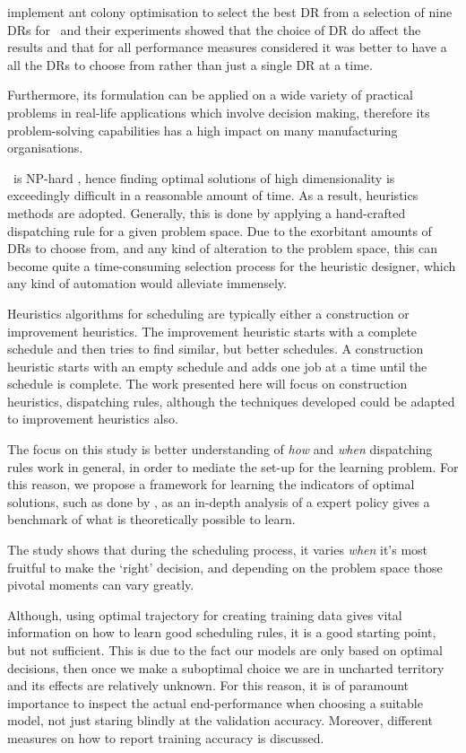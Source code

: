 \documentclass[smallextended]{svjour3}
\begin{document}
\citet{Korytkowski13} implement ant colony optimisation to select the best DR 
from a selection of nine DRs for \JSP~and their experiments showed that the 
choice of DR do affect the results and that for all performance measures 
considered it was better to have a all the DRs to choose from rather than just 
a single DR at a time. 	

Furthermore, its formulation can be applied on a wide variety of practical 
problems in real-life applications which involve decision making, therefore its
problem-solving capabilities has a high impact on many manufacturing 
organisations.

\JSP~is NP-hard \cite{Garey76:NPhard}, hence finding optimal solutions of high 
dimensionality is exceedingly difficult in a reasonable amount of time. 
As a result, heuristics methods are adopted. Generally, this is done by 
applying a hand-crafted dispatching rule for a given problem space. 
Due to the exorbitant amounts of DRs to choose from, and any kind of alteration 
to the problem space, this can become quite a time-consuming selection process 
for the heuristic designer, which any kind of automation would alleviate 
immensely. 

Heuristics algorithms for scheduling are typically either a construction or 
improvement heuristics. The improvement heuristic starts with a complete 
schedule and then tries to find similar, but better schedules.  A construction 
heuristic starts with an empty schedule and adds one job at a time until the 
schedule is complete. The work presented here will focus on construction 
heuristics, dispatching rules, although the techniques developed could be adapted to improvement
heuristics also. 

The focus on this study is better understanding of \emph{how} and \emph{when} 
dispatching rules work in general, in order to mediate the set-up for the 
learning problem.
For this reason, we propose a framework for learning the indicators of optimal 
solutions, such as done by \cite{Siggi10}, as an in-depth analysis of a expert 
policy gives a benchmark of what is theoretically possible to learn. 

The study shows that during the scheduling process, it varies \emph{when} it's 
most fruitful to make the `right' decision, and depending on the problem space 
those pivotal moments can vary greatly. 

Although, using optimal trajectory for creating training data gives vital 
information on how to learn good scheduling rules, it is a good starting point, 
but not sufficient. This is due to the fact our models are only based on 
optimal decisions, then once we make a suboptimal choice we are in uncharted 
territory and its effects are relatively unknown. For this reason, it is of 
paramount importance to inspect the actual end-performance when choosing a 
suitable model, not just staring blindly at the validation accuracy. Moreover, 
different measures on how to report training accuracy is discussed.
\end{document}
